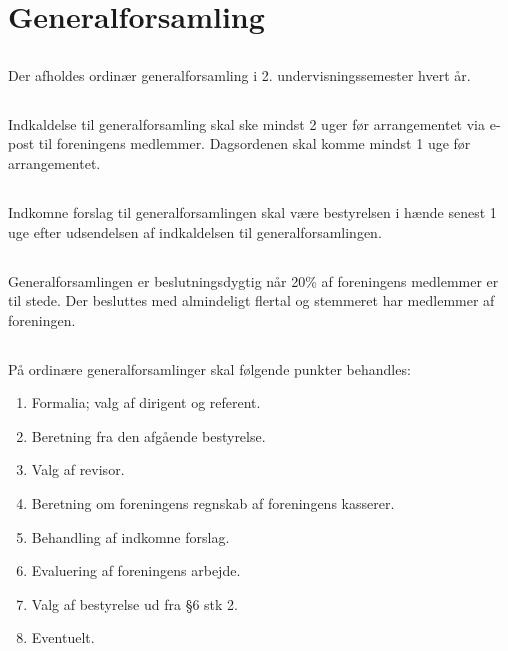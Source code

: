 \documentclass[danish,a4paper,twocolumn,oneside,article]{memoir}
\begin{document}
\chapter{Generalforsamling}

\section{} Der afholdes ordinær generalforsamling i 2. undervisningssemester hvert år.

\section{} Indkaldelse til generalforsamling skal ske mindst 2 uger før arrangementet via e-post til foreningens
medlemmer. Dagsordenen skal komme mindst 1 uge før arrangementet.

\section{} Indkomne forslag til generalforsamlingen skal være bestyrelsen i hænde senest 1 uge efter
udsendelsen af indkaldelsen til generalforsamlingen.

\section{} Generalforsamlingen er beslutningsdygtig når 20\% af foreningens medlemmer er til stede. Der
besluttes med almindeligt flertal og stemmeret har medlemmer af foreningen.

\section{} På ordinære generalforsamlinger skal følgende punkter behandles:

\begin{enumerate}
\item Formalia; valg af dirigent og referent.
\item Beretning fra den afgående bestyrelse.
\item Valg af revisor.
\item Beretning om foreningens regnskab af foreningens kasserer.
\item Behandling af indkomne forslag.
\item Evaluering af foreningens arbejde.
\item Valg af bestyrelse ud fra \S 6 stk 2.
\item Eventuelt.
\end{enumerate}
\end{document}
